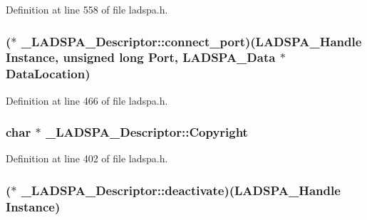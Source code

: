Definition at line 558 of file ladspa.\+h.

\subsubsection[{\texorpdfstring{connect\+\_\+port}{connect_port}}]{($\ast$ \+\_\+\+L\+A\+D\+S\+P\+A\+\_\+\+Descriptor\+::connect\+\_\+port)({\bf L\+A\+D\+S\+P\+A\+\_\+\+Handle} Instance, unsigned long Port, {\bf L\+A\+D\+S\+P\+A\+\_\+\+Data} $\ast$Data\+Location)}\hypertarget{struct___l_a_d_s_p_a___descriptor_a4e48646797e0e95c8a5ba9fd0905f381}{}\label{struct___l_a_d_s_p_a___descriptor_a4e48646797e0e95c8a5ba9fd0905f381}


Definition at line 466 of file ladspa.\+h.

\subsubsection[{\texorpdfstring{Copyright}{Copyright}}]{ char $\ast$ \+\_\+\+L\+A\+D\+S\+P\+A\+\_\+\+Descriptor\+::\+Copyright}\hypertarget{struct___l_a_d_s_p_a___descriptor_aa764f1dfe2a95ec9c4ab55d14c3ea975}{}\label{struct___l_a_d_s_p_a___descriptor_aa764f1dfe2a95ec9c4ab55d14c3ea975}


Definition at line 402 of file ladspa.\+h.

\subsubsection[{\texorpdfstring{deactivate}{deactivate}}]{($\ast$ \+\_\+\+L\+A\+D\+S\+P\+A\+\_\+\+Descriptor\+::deactivate)({\bf L\+A\+D\+S\+P\+A\+\_\+\+Handle} Instance)}\hypertarget{struct___l_a_d_s_p_a___descriptor_ae3111228cb1c3634a5c9767fadad1560}{}\label{struct___l_a_d_s_p_a___descriptor_ae3111228cb1c3634a5c9767fadad1560}


